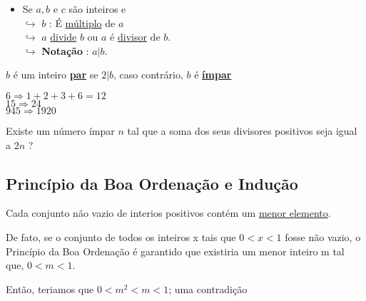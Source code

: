         \begin{itemize}[left=0.5cm, align=left, nosep]
            \item Se $a,b$ e $c$ são inteiros e  \\ 
            $\hookrightarrow$ $b$ : É \underline{múltiplo} de $a$ \\  
            $\hookrightarrow$ $a$ \underline{divide} $b$ ou $a$ é \underline{divisor} de $b$. \\
            $\hookrightarrow$ \textbf{Notação} : $a|b$.
        \end{itemize}

        \begin{definicao}[: Par]
            $b$ é um inteiro \underline{\textbf{par}} se \underline{$2|b$}, caso contrário, $b$ é \underline{\textbf{ímpar}}
        \end{definicao}

        \begin{exemplo}
        $6 \Rightarrow 1 + 2 + 3 + 6 = 12$ \\
        $15 \Rightarrow 24$ \\
        $945 \Rightarrow 1920$
        \end{exemplo}

        \begin{questao}
        Existe um número ímpar $n$ tal que a soma dos seus divisores positivos seja igual a $2n$ ?
        \end{questao}

    \subsection{Princípio da Boa Ordenação e Indução}

        \begin{definicao}
            Cada conjunto não vazio de interios positivos contém um \underline{menor elemento}.
        \end{definicao}

        \begin{exemplo}
        De fato, se o conjunto de todos os inteiros x tais que $0 < x < 1$ fosse não vazio,
        o Princípio da Boa Ordenação é garantido que existiria um menor inteiro m tal que,
        $0 < m < 1$.

        Então, teriamos que $0 < m^2 < m < 1$; uma contradição
        \end{exemplo}

